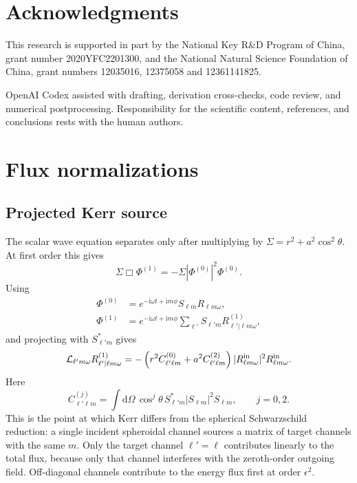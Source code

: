 \documentclass[aps,prd,twocolumn,10pt,nofootinbib,superscriptaddress,floatfix]{revtex4-2}
\newcommand{\dd}{\mathrm{d}}
\newcommand{\ii}{\mathrm{i}}
\begin{document}
\section*{Acknowledgments}

This research is supported in part by the National Key R\&D Program of
China, grant number 2020YFC2201300, and the National Natural Science
Foundation of China, grant numbers 12035016, 12375058 and 12361141825.

OpenAI Codex assisted with drafting, derivation cross-checks, code review,
and numerical postprocessing.  Responsibility for the scientific content,
references, and conclusions rests with the human authors.
\appendix

\section{Flux normalizations}
\label{app:flux}

\subsection{Projected Kerr source}

The scalar wave equation separates only after multiplying by
$\Sigma=r^2+a^2\cos^2\theta$.  At first order this gives
\begin{equation}
\Sigma\Box\Phi^{(1)}=-\Sigma|\Phi^{(0)}|^2\Phi^{(0)} .
\end{equation}
Using
\begin{align}
\Phi^{(0)}
&=e^{-\ii\omega t+\ii m\phi}S_{\ell m}R_{\ell m\omega},
\nonumber\\
\Phi^{(1)}
&=e^{-\ii\omega t+\ii m\phi}
\sum_{\ell'}S_{\ell'm}R^{(1)}_{\ell'|\ell m\omega},
\end{align}
and projecting with $S_{\ell'm}^*$ gives
\begin{equation}
\mathcal L_{\ell'm\omega}R^{(1)}_{\ell'|\ell m\omega}
=-\left(r^2C^{(0)}_{\ell'\ell m}
+a^2C^{(2)}_{\ell'\ell m}\right)
|R_{\ell m\omega}^{\rm in}|^2R_{\ell m\omega}^{\rm in}.
\end{equation}
Here
\begin{equation}
C^{(j)}_{\ell'\ell m}=
\int \dd\Omega\,\cos^j\theta\,
S_{\ell'm}^*|S_{\ell m}|^2S_{\ell m},
\qquad j=0,2 .
\end{equation}
This is the point at which Kerr differs from the spherical Schwarzschild
reduction: a single incident spheroidal channel sources a matrix of target
channels with the same $m$.  Only the target channel $\ell'=\ell$ contributes
linearly to the total flux, because only that channel interferes with the
zeroth-order outgoing field.  Off-diagonal channels contribute to the energy
flux first at order $\epsilon^2$.
\end{document}
